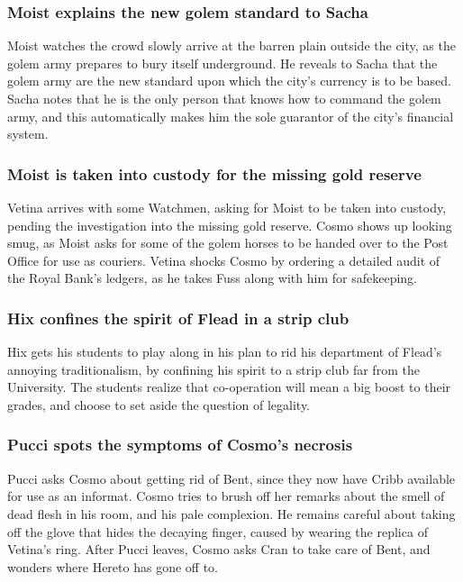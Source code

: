 \subsubsection{\Gls{Moist} explains the new golem standard to \Gls{Sacha}}
\Gls{Moist} watches the crowd slowly arrive at the barren plain outside the city, as the golem
army prepares to bury itself underground. He reveals to \Gls{Sacha} that the golem army are the
new standard upon which the city's currency is to be based. \Gls{Sacha} notes that he is the only
person that knows how to command the golem army, and this automatically makes him the sole guarantor
of the city's financial system.

\subsubsection{\Gls{Moist} is taken into custody for the missing gold reserve}
\Gls{Vetina} arrives with some Watchmen, asking for \Gls{Moist} to be taken into custody, pending
the investigation into the missing gold reserve. \Gls{Cosmo} shows up looking smug, as \Gls{Moist}
asks for some of the golem horses to be handed over to the Post Office for use as couriers.
\Gls{Vetina} shocks \Gls{Cosmo} by ordering a detailed audit of the Royal Bank's ledgers, as he
takes \Gls{Fuss} along with him for safekeeping.

\subsubsection{\Gls{Hix} confines the spirit of \Gls{Flead} in a strip club}
\Gls{Hix} gets his students to play along in his plan to rid his department of \Gls{Flead}'s
annoying traditionalism, by confining his spirit to a strip club far from the University. The
students realize that co-operation will mean a big boost to their grades, and choose to set aside
the question of legality.

\subsubsection{\Gls{Pucci} spots the symptoms of \Gls{Cosmo}'s necrosis}
\Gls{Pucci} asks \Gls{Cosmo} about getting rid of \Gls{Bent}, since they now have \Gls{Cribb}
available for use as an informat. \Gls{Cosmo} tries to brush off her remarks about the smell of
dead flesh in his room, and his pale complexion. He remains careful about taking off the glove that
hides the decaying finger, caused by wearing the replica of \Gls{Vetina}'s ring. After \Gls{Pucci}
leaves, \Gls{Cosmo} asks \Gls{Cran} to take care of \Gls{Bent}, and wonders where \Gls{Hereto} has
gone off to.

